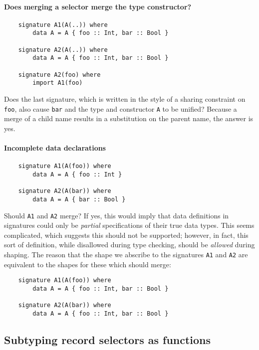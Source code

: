 \documentclass{article}
\begin{document}
\paragraph{Does merging a selector merge the type constructor?}

\begin{verbatim}
    signature A1(A(..)) where
        data A = A { foo :: Int, bar :: Bool }

    signature A2(A(..)) where
        data A = A { foo :: Int, bar :: Bool }

    signature A2(foo) where
        import A1(foo)
\end{verbatim}
%
Does the last signature, which is written in the style of a sharing constraint on \verb|foo|,
also cause \verb|bar| and the type and constructor \verb|A| to be unified?
Because a merge of a child name results in a substitution on the parent name,
the answer is yes.

\paragraph{Incomplete data declarations}

\begin{verbatim}
    signature A1(A(foo)) where
        data A = A { foo :: Int }

    signature A2(A(bar)) where
        data A = A { bar :: Bool }
\end{verbatim}
%
Should \verb|A1| and \verb|A2| merge?  If yes, this would imply
that data definitions in signatures could only be \emph{partial}
specifications of their true data types.  This seems complicated,
which suggests this should not be supported; however, in fact,
this sort of definition, while disallowed during type checking,
should be \emph{allowed} during shaping. The reason that the
shape we abscribe to the signatures \verb|A1| and \verb|A2| are
equivalent to the shapes for these which should merge:

\begin{verbatim}
    signature A1(A(foo)) where
        data A = A { foo :: Int, bar :: Bool }

    signature A2(A(bar)) where
        data A = A { foo :: Int, bar :: Bool }
\end{verbatim}

\subsection{Subtyping record selectors as functions}
\end{document}

